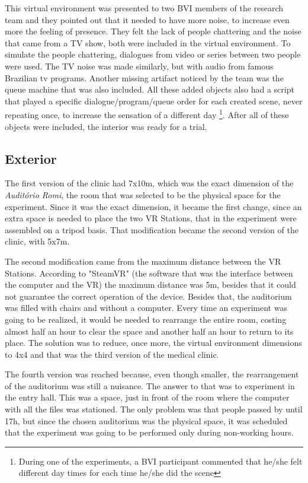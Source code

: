         This virtual environment was presented to two BVI members of the research team and they pointed out that it needed to have more noise, to increase even more the feeling of presence. They felt the lack of people chattering and the noise that came from a TV show, both were included in the virtual environment. To simulate the people chattering, dialogues from video or series between two people were used. The TV noise was made similarly, but with audio from famous Brazilian tv programs. Another missing artifact noticed by the team was the queue machine that was also included. All these added objects also had a script that played a specific dialogue/program/queue order for each created scene, never repeating once, to increase the sensation of a different day \footnote{During one of the experiments, a BVI participant commented that he/she felt different day times for each time he/she did the scene}. After all of these objects were included, the interior was ready for a trial.
        
    \subsection{Exterior}
    \label{subsec:exterior}
        
        The first version of the clinic had 7x10m, which was the exact dimension of the \textit{Auditório Romi}, the room that was selected to be the physical space for the experiment. Since it was the exact dimension, it became the first change, since an extra space is needed to place the two VR Stations, that in the experiment were assembled on a tripod basis. That modification became the second version of the clinic, with 5x7m.
        
        The second modification came from the maximum distance between the VR Stations. According to "SteamVR" (the software that was the interface between the computer and the VR) the maximum distance was 5m, besides that it could not guarantee the correct operation of the device. Besides that, the auditorium was filled with chairs and without a computer. Every time an experiment was going to be realized, it would be needed to rearrange the entire room, costing almost half an hour to clear the space and another half an hour to return to its place. The solution was to reduce, once more, the virtual environment dimensions to 4x4 and that was the third version of the medical clinic.
        
        The fourth version was reached because, even though smaller, the rearrangement of the auditorium was still a nuisance. The answer to that was to experiment in the entry hall. This was a space, just in front of the room where the computer with all the files was stationed. The only problem was that people passed by until 17h, but since the chosen auditorium was the physical space, it was scheduled that the experiment was going to be performed only during non-working hours.
        
